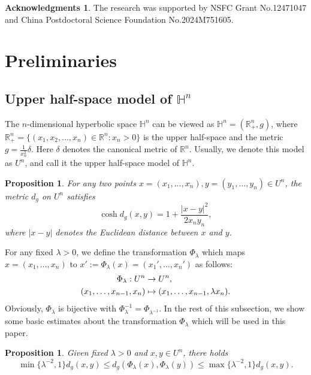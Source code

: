 \documentclass[11pt,reqno]{amsart}
\newtheorem{prop}[thm]{Proposition}
\theoremstyle{definition}
\newtheorem*{ack}{Acknowledgments}
\theoremstyle{remark}
\numberwithin{equation}{section}
\renewcommand{\(}{\left(}
\renewcommand{\)}{\right)}
\renewcommand{\-}{\overline}
\begin{document}
\begin{ack}
	The research was supported by NSFC Grant No.12471047 and  China Postdoctoral Science Foundation No.2024M751605.
\end{ack}
\section{Preliminaries}\label{Sec-pre}
\subsection{Upper half-space model of $\mathbb{H}^n$}\label{Subsec-model} The $n$-dimensional hyperbolic space $\mathbb{H}^n$ can be viewed as $\mathbb{H}^n=(\mathbb{R}^n_{+},g)$, where $\mathbb{R}^n_{+}=\{(x_1,x_2,\dots,x_n)\in\mathbb{R}^n:x_n>0\}$ is the upper half-space and the metric $g=\frac{1}{x_n^2}\delta$. Here $\delta$ denotes the canonical metric of $\mathbb{R}^n$. Usually, we denote this model as $U^n$, and call it the upper half-space model of $\mathbb{H}^n$.
\begin{prop}{\cite[Theorem 4.6.1]{Ratcliffe19}}
	For any two points $x=(x_1,\dots,x_n), y=(y_1,\dots,y_n)\in U^n$, the metric $d_g$ on $U^n$ satisfies
	\begin{equation}\label{Ex-metric}
		\cosh d_g(x,y)=1+\frac{|x-y|^2}{2x_n y_n},
	\end{equation}
where $|x-y|$ denotes the Euclidean distance between $x$ and $y$.
\end{prop}
For any fixed $\lambda>0$, we define the transformation $\Phi_{\lambda}$ which maps $x=(x_1,\dots,x_n)$ to $x':=\Phi_{\lambda}(x)=(x_1',\dots,x_n')$ as follows:
\begin{align}
	\Phi_{\lambda}: U^n&\to U^n,\notag\\
	(x_1,\dots,x_{n-1},x_n)&\mapsto(x_1,\dots,x_{n-1},\lambda x_n).\label{Defn-Phi}
\end{align}
Obviously, $\Phi_{\lambda}$ is bijective with $\Phi_{\lambda}^{-1}=\Phi_{{\lambda}^{-1}}$.  In the rest of this subsection, we show some basic estimates about the transformation $\Phi_{\lambda}$ which will be used in this paper.
\begin{prop}\label{Prop-Lip}
	Given fixed $\lambda>0$ and $x,y\in U^n$, there holds
	\begin{equation}\label{Es-dis}
		\min\{{\lambda}^{-2},1\}d_g(x,y)\leq d_g(\Phi_{\lambda}(x),\Phi_{\lambda}(y))\leq \max\{{\lambda}^{-2},1\} d_g(x,y).
	\end{equation}
\end{prop}
\end{document}
